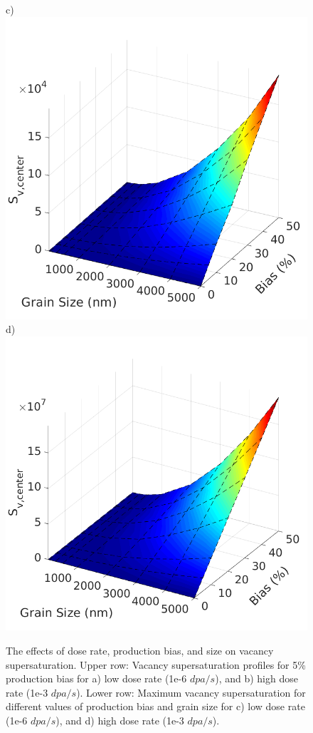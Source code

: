 \documentclass[utf8]{frontiersSCNS} %
\begin{document}
\begin{figure}[h!]
        c)\includegraphics[scale=0.35]{Fig7_c}
        d)\includegraphics[scale=0.35]{Fig7_d}
        \caption{The effects of dose rate, production bias, and size on vacancy supersaturation. Upper row: Vacancy supersaturation profiles for 5\% production bias for a) low dose rate (1e-6 $dpa/s$), and b) high dose rate (1e-3 $dpa/s$). Lower row: Maximum vacancy supersaturation for different values of production bias and grain size for c) low dose rate (1e-6 $dpa/s$), and d) high dose rate (1e-3 $dpa/s$).}
        \label{figure:vacancy_supersaturation_neutron}
    \end{figure}
    
\end{document}
